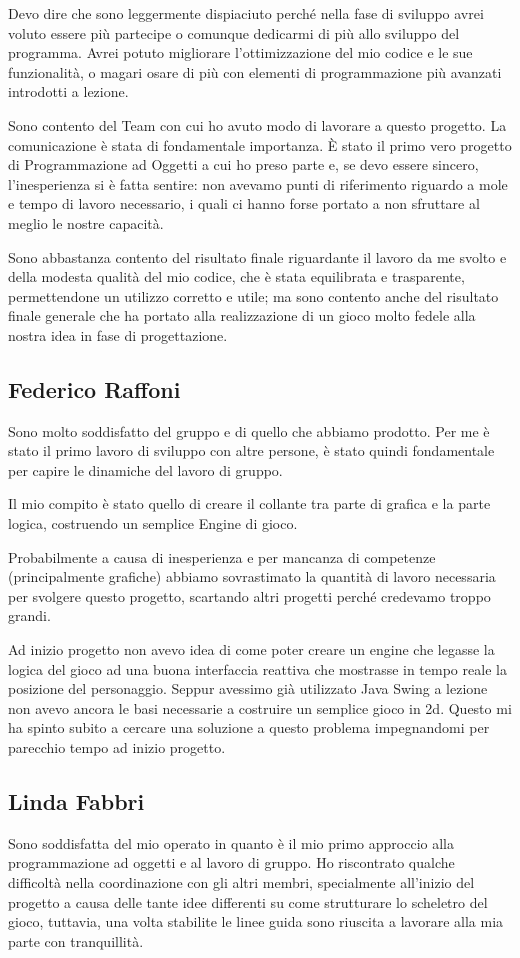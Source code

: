 \documentclass[a4paper,12pt]{report}
\begin{document}
Devo dire che sono leggermente dispiaciuto perché nella fase di sviluppo avrei voluto essere più partecipe o comunque dedicarmi di più allo sviluppo del programma. Avrei potuto migliorare l'ottimizzazione del mio codice e le sue funzionalità, o magari osare di più con elementi di programmazione più avanzati introdotti a lezione. 

Sono contento del Team con cui ho avuto modo di lavorare a questo progetto. La comunicazione è stata di fondamentale importanza.
È stato il primo vero progetto di Programmazione ad Oggetti a cui ho preso parte e, se devo essere sincero, l'inesperienza si è fatta sentire: non avevamo punti di riferimento riguardo a mole e tempo di lavoro necessario, i quali ci hanno forse portato a non sfruttare al meglio le nostre capacità.

Sono abbastanza contento del risultato finale riguardante il lavoro da me svolto e della modesta qualità del mio codice, che è stata equilibrata e trasparente, permettendone un utilizzo corretto e utile; ma sono contento anche del risultato finale generale che ha portato alla realizzazione di un gioco molto fedele alla nostra idea in fase di progettazione.

\subsection{Federico Raffoni}
Sono molto soddisfatto del gruppo e di quello che abbiamo prodotto. Per me è stato il primo lavoro di sviluppo con altre persone, è stato quindi fondamentale per capire le dinamiche del lavoro di gruppo. 

Il mio compito è stato quello di creare il collante tra parte di grafica e la parte logica, costruendo un semplice Engine di gioco.

Probabilmente a causa di inesperienza e per mancanza di competenze (principalmente grafiche) abbiamo sovrastimato la quantità di lavoro necessaria per svolgere questo progetto, scartando altri progetti perché credevamo troppo grandi.

Ad inizio progetto non avevo idea di come poter creare un engine che legasse la logica del gioco ad una buona interfaccia reattiva che mostrasse in tempo reale la posizione del personaggio. Seppur avessimo già utilizzato Java Swing a lezione non avevo ancora le basi necessarie a costruire un semplice gioco in 2d. Questo mi ha spinto subito a cercare una soluzione a questo problema impegnandomi per parecchio tempo ad inizio progetto.
\subsection{Linda Fabbri}
Sono soddisfatta del mio operato in quanto è il mio primo approccio alla programmazione ad oggetti e al lavoro di gruppo. Ho riscontrato qualche difficoltà nella coordinazione con gli altri membri, specialmente all’inizio del progetto a causa delle tante idee differenti su come strutturare lo scheletro del gioco, tuttavia, una volta stabilite le linee guida sono riuscita a lavorare alla mia parte con tranquillità. 
\end{document}
